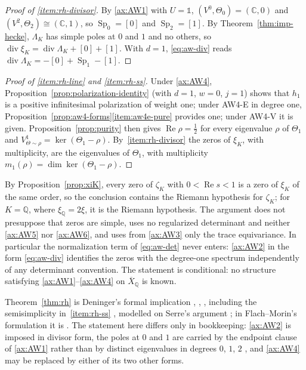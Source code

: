 \documentclass[11pt]{amsart}
\theoremstyle{plain}
\theoremstyle{definition}
\theoremstyle{remark}
\numberwithin{equation}{section}
\newcommand{\C}{\mathbb{C}}
\newcommand{\Q}{\mathbb{Q}}
\newcommand{\Xbar}{\overline{X}}
\DeclareMathOperator{\divisor}{div}
\DeclareMathOperator{\Rea}{Re}
\renewcommand{\Re}{\Rea}
\begin{document}
\begin{proof}[Proof of \ref{item:rh-divisor}]
By \ref{ax:AW1} with $U=\mathbb 1$, $(V^0,\Theta_0)=(\C,0)$ and
$(V^2,\Theta_2)\cong(\C,1)$, so $\operatorname{Sp}_0=[0]$ and
$\operatorname{Sp}_2=[1]$. By Theorem~\ref{thm:imp-hecke}, $\Lambda_K$
has simple poles at $0$ and $1$ and no others, so
$\divisor\xi_K=\divisor\Lambda_K+[0]+[1]$. With $d=1$,
\eqref{eq:aw-div} reads $\divisor\Lambda_K=-[0]+\operatorname{Sp}_1-[1]$.
\end{proof}

\begin{proof}[Proof of \ref{item:rh-line} and \ref{item:rh-ss}]
Under \ref{ax:AW4}, Proposition~\ref{prop:polarization-identity} (with
$d=1$, $w=0$, $j=1$) shows that $h_1$ is a positive infinitesimal
polarization of weight one; under AW4-E in degree one,
Proposition~\ref{prop:aw4-forms}\ref{item:aw4e-pure} provides one; under
AW4-V it is given. Proposition~\ref{prop:purity} then gives
$\Re\rho=\tfrac12$ for every eigenvalue $\rho$ of $\Theta_1$ and
$V^1_{\Theta\sim\rho}=\ker(\Theta_1-\rho)$. By~\ref{item:rh-divisor} the
zeros of $\xi_K$, with multiplicity, are the eigenvalues of $\Theta_1$,
with multiplicity $m_1(\rho)=\dim\ker(\Theta_1-\rho)$.
\end{proof}

By Proposition~\ref{prop:xiK}, every zero of $\zeta_K$ with
$0<\Re s<1$ is a zero of $\xi_K$ of the same order, so the conclusion
contains the Riemann hypothesis for $\zeta_K$; for $K=\Q$, where
$\xi_\Q=2\xi$, it is the Riemann hypothesis. The argument does not
presuppose that zeros are simple, uses no regularized determinant and
neither \ref{ax:AW5} nor \ref{ax:AW6}, and uses from \ref{ax:AW3} only
the trace equivariance. In particular the normalization term of
\eqref{eq:aw-det} never enters: \ref{ax:AW2} in the form
\eqref{eq:aw-div} identifies the zeros with the degree-one spectrum
independently of any determinant convention. The statement is
conditional: no structure satisfying \ref{ax:AW1}--\ref{ax:AW4} on
$\Xbar_\Q$ is known.

Theorem~\ref{thm:rh} is Deninger's formal implication
\cite[(7.11)--(7.13), pp.~32--33]{Deninger1994Motivic},
\cite[pp.~168--169]{Deninger1998Analogies},
\cite[pp.~4--5]{Deninger2010HilbertPolya}, including the semisimplicity
in~\ref{item:rh-ss} \cite[2.7, p.~3]{Deninger2022NoWeil}, modelled on
Serre's argument \cite{Serre1960Analogues}; in Flach--Morin's
formulation it is \cite[Conjecture~2.3(iv)--(v), p.~522]%
{FlachMorin2020DeningerWeilArakelov}. The statement here differs only
in bookkeeping: \ref{ax:AW2} is imposed in divisor form, the poles at
$0$ and $1$ are carried by the endpoint clause of \ref{ax:AW1} rather
than by distinct eigenvalues in degrees $0$, $1$, $2$
\cite[p.~168]{Deninger1998Analogies}, and \ref{ax:AW4} may be replaced
by either of its two other forms.
\end{document}
